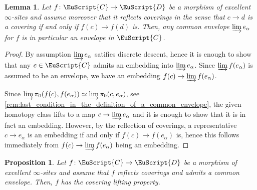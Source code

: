 \documentclass[oneside,a4paper]{amsart}
\newcommand{\euscr}[1]{\EuScript{#1}} %
\newcommand{\ccat}{\euscr{C}} %
\newcommand{\dcat}{\euscr{D}} %
\theoremstyle{plain}
\newtheorem{lemma}[thm]{Lemma}
\newtheorem{prop}[thm]{Proposition}
\theoremstyle{definition}
\theoremstyle{remark}
\begin{document}
\begin{lemma}
\label{lemma:a_common_envelope_is_also_an_envelope_on_the_base}
Let $f \colon \ccat \rightarrow \dcat$ be a morphism of excellent $\infty$-sites and assume moreover that it reflects coverings in the sense that $c \rightarrow d$ is a covering if and only if $f(c) \rightarrow f(d)$ is. Then, any common envelope $\varinjlim e_{\alpha}$ for $f$ is in particular an envelope in $\ccat$. 
\end{lemma}

\begin{proof}
By assumption $\varinjlim e_{\alpha}$ satifies discrete descent, hence it is enough to show that any $c \in \ccat$ admits an embedding into $\varinjlim e_{\alpha}$. Since $\varinjlim f(e_{\alpha})$ is assumed to be an envelope, we have an embedding $f(c) \rightarrow \varinjlim f(e_{\alpha})$. 

Since $\varinjlim \pi_{0}(f(c), f(e_{\alpha})) \simeq \varinjlim \pi_{0}(c, e_{\alpha})$, see \cref{rem:last_condition_in_the_definition_of_a_common_envelope}, the given homotopy class lifts to a map $c \rightarrow \varinjlim e_{\alpha}$ and it is enough to show that it is in fact an embedding. However, by the reflection of coverings, a representative $c \rightarrow e_{\alpha}$ is an embedding if and only if $f(c) \rightarrow f(e_{\alpha})$ is, hence this follows immediately from $f(c) \rightarrow \varinjlim f(e_{\alpha})$ being an embedding. 
\end{proof}

\begin{prop}
\label{prop:cover_reflecting_morphism_of_excellent_sites_with_envelope_is_clp}
Let $f \colon \ccat \rightarrow \dcat$ be a morphism of excellent $\infty$-sites and assume that $f$ reflects coverings and admits a common envelope. Then, $f$ has the covering lifting property. 
\end{prop}
\end{document}
